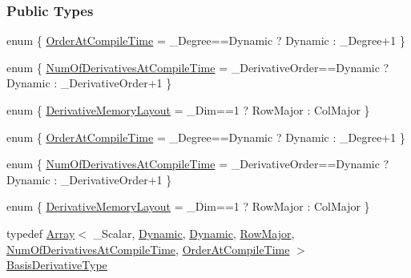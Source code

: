 \subsubsection*{Public Types}
\begin{DoxyCompactItemize}
\item 
enum \{ \hyperlink{group___splines___module_a426db71a3c0b36612af57e0adcf0ea9baf038b6f42400b01b8037c2e3a092023c}{Order\+At\+Compile\+Time} = \+\_\+\+Degree==Dynamic ? Dynamic \+: \+\_\+\+Degree+1
 \}
\item 
enum \{ \hyperlink{group___splines___module_a96228f861ee39497b9092c6fd20eed35a24665032b11607201b7f394588f03f05}{Num\+Of\+Derivatives\+At\+Compile\+Time} = \+\_\+\+Derivative\+Order==Dynamic ? Dynamic \+: \+\_\+\+Derivative\+Order+1
 \}
\item 
enum \{ \hyperlink{group___splines___module_a3d4de3f96ecb4755e1d7782bf8275c5daf506b7fd844ab8dfe5262f915e713b28}{Derivative\+Memory\+Layout} = \+\_\+\+Dim==1 ? Row\+Major \+: Col\+Major
 \}
\item 
enum \{ \hyperlink{group___splines___module_a426db71a3c0b36612af57e0adcf0ea9baf038b6f42400b01b8037c2e3a092023c}{Order\+At\+Compile\+Time} = \+\_\+\+Degree==Dynamic ? Dynamic \+: \+\_\+\+Degree+1
 \}
\item 
enum \{ \hyperlink{group___splines___module_a96228f861ee39497b9092c6fd20eed35a24665032b11607201b7f394588f03f05}{Num\+Of\+Derivatives\+At\+Compile\+Time} = \+\_\+\+Derivative\+Order==Dynamic ? Dynamic \+: \+\_\+\+Derivative\+Order+1
 \}
\item 
enum \{ \hyperlink{group___splines___module_a3d4de3f96ecb4755e1d7782bf8275c5daf506b7fd844ab8dfe5262f915e713b28}{Derivative\+Memory\+Layout} = \+\_\+\+Dim==1 ? Row\+Major \+: Col\+Major
 \}
\item 
\mbox{\label{group___splines___module_a507283e4ba6108e20eae19e805816770}} 
typedef \hyperlink{group___core___module_class_eigen_1_1_array}{Array}$<$ \+\_\+\+Scalar, \hyperlink{namespace_eigen_ad81fa7195215a0ce30017dfac309f0b2}{Dynamic}, \hyperlink{namespace_eigen_ad81fa7195215a0ce30017dfac309f0b2}{Dynamic}, \hyperlink{group__enums_ggaacded1a18ae58b0f554751f6cdf9eb13acfcde9cd8677c5f7caf6bd603666aae3}{Row\+Major}, \hyperlink{group___splines___module_a96228f861ee39497b9092c6fd20eed35a24665032b11607201b7f394588f03f05}{Num\+Of\+Derivatives\+At\+Compile\+Time}, \hyperlink{group___splines___module_a426db71a3c0b36612af57e0adcf0ea9baf038b6f42400b01b8037c2e3a092023c}{Order\+At\+Compile\+Time} $>$ \hyperlink{group___splines___module_a507283e4ba6108e20eae19e805816770}{Basis\+Derivative\+Type}

\end{DoxyCompactItemize}
